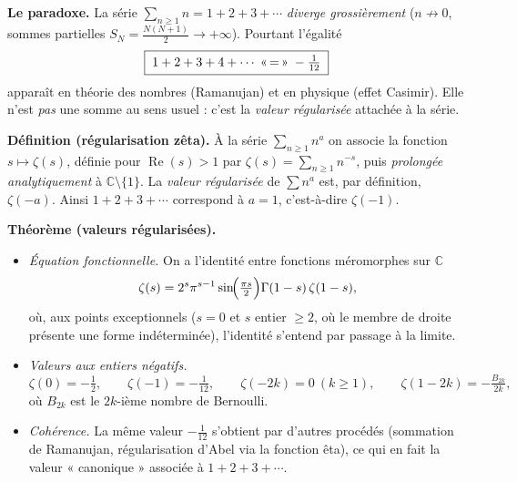 



\begin{tcolorbox}[thmbox]
  \textbf{Le paradoxe.}\enspace{}
  La série $\sum_{n\geq 1} n = 1+2+3+\cdots$ \emph{diverge grossièrement}
  ($n\not\to 0$, sommes partielles $S_N=\tfrac{N(N+1)}{2}\to+\infty$). Pourtant
  l'égalité
  \[
    \boxed{\;1+2+3+4+\cdots \;\text{«\,$=$\,»}\; -\tfrac{1}{12}\;}
  \]
  apparaît en théorie des nombres (Ramanujan) et en physique (effet Casimir).
  Elle n'est \emph{pas} une somme au sens usuel : c'est la \emph{valeur
  régularisée} attachée à la série.

  \medskip
  \textbf{Définition (régularisation zêta).}\enspace{}
  À la série $\sum_{n\geq 1} n^{a}$ on associe la fonction $s\mapsto\zeta(s)$,
  définie pour $\operatorname{Re}(s)>1$ par $\zeta(s)=\sum_{n\geq 1}n^{-s}$, puis
  \emph{prolongée analytiquement} à $\mathbb{C}\setminus\{1\}$. La \emph{valeur
  régularisée} de $\sum n^{a}$ est, par définition, $\zeta(-a)$. Ainsi
  $1+2+3+\cdots$ correspond à $a=1$, c'est-à-dire $\zeta(-1)$.

  \medskip
  \textbf{Théorème (valeurs régularisées).}
  \begin{itemize}
    \item \textit{Équation fonctionnelle.} On a l'identité entre fonctions
    méromorphes sur $\mathbb{C}$
    \[
      \zeta(s)=2^{s}\pi^{s-1}\sin\!\Bigl(\tfrac{\pi s}{2}\Bigr)\Gamma(1-s)\,\zeta(1-s),
    \]
    où, aux points exceptionnels ($s=0$ et $s$ entier $\geq 2$, où le membre de
    droite présente une forme indéterminée), l'identité s'entend par passage à
    la limite.
    \item \textit{Valeurs aux entiers négatifs.}
    \[
      \zeta(0)=-\tfrac12,\qquad
      \zeta(-1)=-\tfrac{1}{12},\qquad
      \zeta(-2k)=0\ (k\geq 1),\qquad
      \zeta(1-2k)=-\tfrac{B_{2k}}{2k},
    \]
    où $B_{2k}$ est le $2k$-ième nombre de Bernoulli.
    \item \textit{Cohérence.} La même valeur $-\tfrac1{12}$ s'obtient par d'autres
    procédés (sommation de Ramanujan, régularisation d'Abel via la fonction êta),
    ce qui en fait la valeur « canonique » associée à $1+2+3+\cdots$.
  \end{itemize}
\end{tcolorbox}


